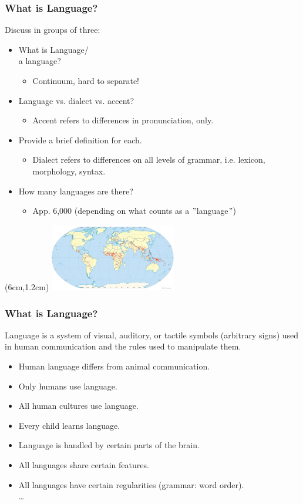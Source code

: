 \documentclass[12pt, table]{beamer}
\begin{document}
\begin{frame}
\frametitle{What is Language?}
Discuss in groups of three:
\begin{itemize}
\item What is Language/\\ a language?
\begin{itemize}
\item Continuum, hard to separate!
\end{itemize}
\item Language vs. dialect vs. accent?
\begin{itemize}
\item Accent refers to differences in pronunciation, only.
\end{itemize}
\item Provide a brief definition for each.
\begin{itemize}
\item Dialect refers to differences on all levels of grammar, i.e. lexicon, morphology, syntax.
\end{itemize}
\item How many languages are there? 
\begin{itemize}
\item App. 6,000 (depending on what counts as a $"$language$"$)
\end{itemize}
\end{itemize}
\begin{textblock*}{1.5cm}(6cm,1.2cm)
\includegraphics[width=5.5cm]{images/worldlanguages.png}
\end{textblock*}
\end{frame}

\begin{frame}
\frametitle{What is Language?}
Language is a system of visual, auditory, or tactile symbols (arbitrary signs) used in human communication and the rules used to manipulate them.\\
\begin{itemize} 
\item Human language differs from animal communication.
\item Only humans use language.
\item All human cultures use language. 
\item Every child learns language.
\item Language is handled by certain parts of the brain.
\item All languages share certain features.
\item All languages have certain regularities (grammar: word order).\\
\dots
\end{itemize}
\end{frame}
\end{document}
